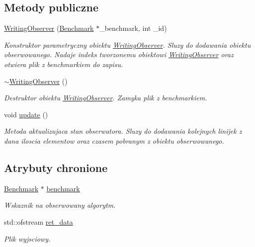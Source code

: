\subsection*{Metody publiczne}
\begin{DoxyCompactItemize}
\item 
\hyperlink{class_writing_observer_a3493eeeaa50bb703c6d30899ccd97c7f}{Writing\-Observer} (\hyperlink{class_benchmark}{Benchmark} $\ast$\-\_\-benchmark, int \-\_\-id)
\begin{DoxyCompactList}\small\item\em Konstruktor parametryczny obiektu \hyperlink{class_writing_observer}{Writing\-Observer}. Sluzy do dodawania obiektu obserwowanego. Nadaje indeks tworzonemu obiektowi \hyperlink{class_writing_observer}{Writing\-Observer} oraz otwiera plik z benchmarkiem do zapisu. \end{DoxyCompactList}\item 
\hyperlink{class_writing_observer_a94f0c7b3f3fe9d96771912ddac3f5333}{$\sim$\-Writing\-Observer} ()
\begin{DoxyCompactList}\small\item\em Destruktor obiektu \hyperlink{class_writing_observer}{Writing\-Observer}. Zamyka plik z benchmarkiem. \end{DoxyCompactList}\item 
void \hyperlink{class_writing_observer_a7b5aa3fa85ae0e1d27ccd8b08366f043}{update} ()
\begin{DoxyCompactList}\small\item\em Metoda aktualizujaca stan obserwatora. Sluzy do dodawania kolejnych linijek z dana iloscia elementow oraz czasem pobranym z obiektu obserwowanego. \end{DoxyCompactList}\end{DoxyCompactItemize}
\subsection*{Atrybuty chronione}
\begin{DoxyCompactItemize}
\item 
\hyperlink{class_benchmark}{Benchmark} $\ast$ \hyperlink{class_writing_observer_a1db5db63499d7345e7a1ad42316a4f01}{benchmark}
\begin{DoxyCompactList}\small\item\em Wskaznik na obserwowany algorytm. \end{DoxyCompactList}\item 
std\-::ofstream \hyperlink{class_writing_observer_a45c8c4d5ae006232061423c657fd1eeb}{ret\-\_\-data}
\begin{DoxyCompactList}\small\item\em Plik wyjsciowy. \end{DoxyCompactList}\end{DoxyCompactItemize}


